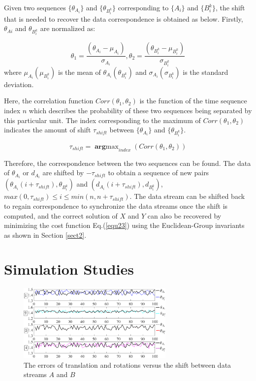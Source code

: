 \documentclass[letterpaper, 10 pt, conference]{ieeeconf}  %
\begin{document}
Given two sequences $\{\theta_{A_{i}}\}$ and $\{\theta_{B_{i}^{k}}\}$ corresponding to  $\{A_{i}\}$ and $\{B_{i}^{k}\}$, the shift that is needed to recover the data correspondence is obtained as below.
Firstly, $\theta_{Ai}$ and $\theta_{B_{i}^{k}}$ are normalized as:

\begin{equation}\label{equ29}
    \theta_{1}=\frac{(\theta_{A_{i}}-\mu_{A_{i}})}{\sigma_{A_{i}}}, \theta_{2}=\frac{(\theta_{B_{i}^{k}}-\mu_{B_{i}^{k}})}{\sigma_{B_{i}^{k}}}
\end{equation}
where $\mu_{A_{i}}(\mu_{B_{i}^{k}})$ is the mean of $\theta_{A_{i}}(\theta_{B_{i}^{k}})$ and $\sigma_{A_{i}}(\sigma_{B_{i}^{k}})$ is the standard deviation.

Here, the correlation function $Corr(\theta_{1},\theta_{2})$  is the function of the time sequence index $n$ which describes the probability of these two sequences being separated by this particular unit. The index corresponding to the maximum of $Corr(\theta_{1},\theta_{2})$  indicates the amount of shift $\tau_{shift}$ between $\{\theta_{A_{i}}\}$ and $\{\theta_{B_{i}^{k}}\}$.

\begin{equation}\label{equ30}
    \tau_{shift} = \mathop{\mathbf{arg}max}_{index}(Corr(\theta_{1},\theta_{2}))
\end{equation}

Therefore, the correspondence between the two sequences can be found. The data of ${\theta_{A_{i}}}$ or ${d_{A_{i}}}$ are shifted by $-\tau_{shift}$ to obtain a sequence of new pairs $({\theta_{A_{i}}(i+\tau_{shift})},{\theta_{B_{i}^{k}}})$ and $({d_{A_{i}}(i+\tau_{shift})},{d_{B_{i}^{k}}})$, $max(0,\tau_{shift})\leq i \leq min(n,n+\tau_{shift})$. The data stream can be shifted back to regain correspondence to synchronize the data streams once the shift is computed, and the correct solution of $X$ and $Y$ can also be recovered by minimizing the cost function Eq.(\ref{equ23}) using the Euclidean-Group invariants as shown in Section \ref{sect2}.


\section{Simulation Studies}
\label{sect4}

\begin{center}
\begin{figure}
\centering
\includegraphics[width=3in]{fig2.eps}
\caption{
The errors of translation and rotations versus the shift between data streams $A$ and $B$
}
\label{fig2}
\end{figure}
\end{center}
\end{document}
